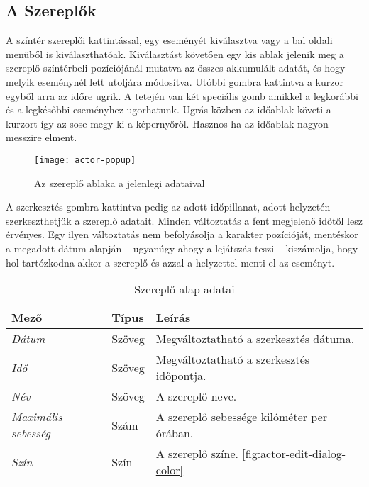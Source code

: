 \subsection{A Szereplők} \label{section:ui-actors}

A színtér szereplői kattintással, egy eseményét kiválasztva vagy a bal oldali menüből is kiválaszthatóak. Kiválasztást követően egy kis ablak jelenik meg a szereplő színtérbeli pozíciójánál mutatva az összes akkumulált adatát, és hogy melyik eseménynél lett utoljára módosítva. Utóbbi gombra kattintva a kurzor egyből arra az időre ugrik. A tetején van két speciális gomb amikkel a legkorábbi és a legkésőbbi eseményhez ugorhatunk. Ugrás közben az időablak követi a kurzort így az sose megy ki a képernyőről. Hasznos ha az időablak nagyon messzire elment.

\begin{figure}[h!]
	\centering
	\texttt{[image: actor-popup]}
	\caption{Az szereplő ablaka a jelenlegi adataival}
	\label{fig:actor-popup}
\end{figure}

A szerkesztés gombra kattintva pedig az adott időpillanat, adott helyzetén szerkeszthetjük a szereplő adatait. Minden változtatás a fent megjelenő időtől lesz érvényes. Egy ilyen változtatás nem befolyásolja a karakter pozícióját, mentéskor a megadott dátum alapján -- ugyanúgy ahogy a lejátszás teszi -- kiszámolja, hogy hol tartózkodna akkor a szereplő és azzal a helyzettel menti el az eseményt.

\begin{table}[H]
	\centering
	\begin{tabular}{ | m{} | m{} | m{} | }
		\hline
		\textbf{Mező} & \textbf{Típus} & \textbf{Leírás} \\
		\hline \hline
		\emph{Dátum} & Szöveg & Megváltoztatható a szerkesztés dátuma. \\
		\hline
		\emph{Idő} & Szöveg & Megváltoztatható a szerkesztés időpontja. \\
		\hline
		\emph{Név} & Szöveg & A szereplő neve.  \\
		\hline
		\emph{Maximális sebesség} & Szám & A szereplő sebessége kilóméter per órában. \\
		\hline
		\emph{Szín} & Szín & A szereplő színe. \ref{fig:actor-edit-dialog-color}  \\
		\hline
	\end{tabular}
	\caption{Szereplő alap adatai}
	\label{tab:create-project-form}
\end{table}

